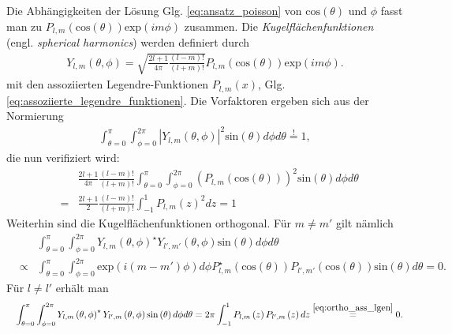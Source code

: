 \documentclass{book}
\newcommand{\hastobe}{\stackrel{!}{=}}
\renewcommand{\exp}{\text{exp}}
\renewcommand{\sin}{\text{sin}}
\renewcommand{\cos}{\text{cos}}
\begin{document}
Die Abhängigkeiten der Lösung Glg. \eqref{eq:ansatz_poisson} von $\cos\left(\theta\right)$ und $\phi$ fasst man zu $P_{l, m}\left(\cos\left(\theta\right)\right)\exp\left(im\phi\right)$ zusammen. Die \textit{Kugelflächenfunktionen} (engl. \textit{spherical harmonics}) werden definiert durch
%
\begin{eqnarray}
Y_{l, m}\left(\theta, \phi\right) = \sqrt{\frac{2l + 1}{4\pi}\frac{\left(l - m\right)!}{\left(l + m\right)!}}P_{l, m}\left(\cos\left(\theta\right)\right)\exp\left(im\phi\right).\label{eq:spherical_harmionen}
\end{eqnarray}
%
mit den assoziierten Legendre-Funktionen $P_{l, m}\left(x\right)$, Glg. \eqref{eq:assoziierte_legendre_funktionen}. Die Vorfaktoren ergeben sich aus der Normierung
%
\begin{eqnarray}
\int_{\theta = 0}^\pi\int_{\phi = 0}^{2\pi}\left|Y_{l, m}\left(\theta, \phi\right)\right|^2\sin\left(\theta\right) d\phi d\theta\hastobe1, 
\end{eqnarray}
%
die nun verifiziert wird:
%
\begin{eqnarray}
&&\frac{2l + 1}{4\pi}\frac{\left(l - m\right)!}{\left(l + m\right)!}\int_{\theta = 0}^\pi\int_{\phi = 0}^{2\pi}\left(P_{l, m}\left(\cos\left(\theta\right)\right)\right)^2\sin\left(\theta\right) d\phi d\theta\nonumber\\
& = & \frac{2l + 1}{2}\frac{\left(l - m\right)!}{\left(l + m\right)!}\int_{-1}^{1}P_{l, m}\left(z\right)^2dz = 1
\end{eqnarray}
%
Weiterhin sind die Kugelflächenfunktionen orthogonal. Für $m\not = m'$ gilt nämlich
%
\begin{eqnarray}
&&\int_{\theta = 0}^{\pi}\int_{\phi = 0}^{2\pi}Y_{l, m}\left(\theta, \phi\right)^\star Y_{l', m'}\left(\theta, \phi\right)\sin\left(\theta\right) d\phi d\theta\nonumber\\
&\propto&\int_{\theta = 0}^{\pi}\int_{\phi = 0}^{2\pi}\exp\left(i\left(m - m'\right)\phi\right)d\phi P_{l, m}^{\star}\left(\cos\left(\theta\right)\right)P_{l', m'}\left(\cos\left(\theta\right)\right)\sin\left(\theta\right) d\theta = 0.
\end{eqnarray}
%
Für $l\not = l'$ erhält man
%
\begin{eqnarray}
&&\int_{\theta = 0}^{\pi}\int_{\phi = 0}^{2\pi}Y_{l, m}\left(\theta, \phi\right)^\star Y_{l', m}\left(\theta, \phi\right)\sin\left(\theta\right) d\phi d\theta = 2\pi\int_{-1}^{1}P_{l, m}\left(z\right)P_{l', m}\left(z\right)dz\stackrel{\eqref{eq:ortho_ass_lgen}}{=}0.
\end{eqnarray}
\end{document}
